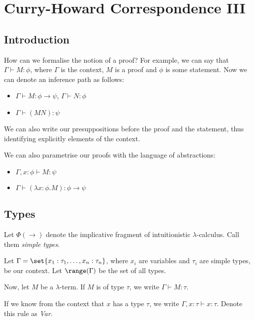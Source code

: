\documentclass[11pt]{scrartcl}
\begin{document}
  \section{Curry-Howard Correspondence III}

  \subsection{Introduction}

  How can we formalise the notion of a proof? For example, we can say
  that $\Gamma \vdash M: \phi$, where $\Gamma$ is the context, $M$ is
  a proof and $\phi$ is some statement. Now we can denote an inference path as follows:

  \begin{itemize}
  \item $\Gamma \vdash M: \phi \to \psi$, $\Gamma \vdash N:\phi$
  \item $\Gamma \vdash (MN): \psi$
  \end{itemize}

  We can also write our presuppositions before the proof and the
  statement, thus identifying explicitly elements of the context.

  We can also parametrise our proofs with the language of abstractions:

  \begin{itemize}
  \item $\Gamma, x: \phi \vdash M:\psi$
  \item $\Gamma \vdash (\lambda x: \phi. M):\phi \to \psi$
  \end{itemize}

  \subsection{Types}

  Let $\Phi(\to)$ denote the implicative fragment of intuitionistic
  $\lambda$-calculus. Call them \textit{simple types}.

  Let $\Gamma = \set{x_{1}:\tau_{1}, \dots, x_{n}:\tau_{n}}$,
  where $x_{i}$ are variables and $\tau_{i}$ are simple types, be our
  context. Let $\range(\Gamma)$ be the set of all types.

  Now, let $M$ be a $\lambda$-term. If $M$ is of type $\tau$, we write
  $\Gamma\vdash M: \tau$.

  If we know from the context that $x$ has a type $\tau$, we
  write $\Gamma, x: \tau \vdash x:\tau$. Denote this rule as \textit{Var}.
\end{document}
